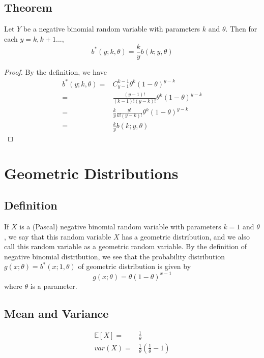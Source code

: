 \documentclass[titlepage]{article}
\begin{document}
        \subsection*{Theorem}
            Let $Y$ be a negative binomial random variable with parameters $k$ and $\theta$. Then for each $y=k,k+1...$,
            $$b^*(y;k,\theta)=\frac{k}{y}b(k;y,\theta)$$
            \begin{proof}
                By the definition, we have 
                \begin{equation*}
                    \begin{split}
                        b^*(y;k,\theta)=&C_{y-1}^{k-1}\theta^k(1-\theta)^{y-k}\\
                            =&\frac{(y-1)!}{(k-1)!(y-k)!}\theta^k(1-\theta)^{y-k}\\
                            =&\frac{k}{y}\frac{y!}{k!(y-k)!}\theta^k(1-\theta)^{y-k}\\
                            =&\frac{k}{y}b(k;y,\theta)
                    \end{split}
                \end{equation*}
            \end{proof}
    \section{Geometric Distributions}
        \subsection*{Definition}
            If $X$ is a (Pascal) negative binomial random variable with parameters $k=1$ and $\theta$, we say that this random variable $X$ has a geometric distribution, and we also call this random variable as a geometric random variable. By the definition of negative binomial distribution, we see that the probability distribution $g(x;\theta)=b^*(x;1,\theta)$ of geometric distribution is given by 
            $$g(x;\theta)=\theta(1-\theta)^{x-1}$$
            where $\theta$ is a parameter.
        \subsection*{Mean and Variance}
            \begin{equation*}
                \begin{split}
                    \mathbb{E}[X]=&\frac{1}{\theta}\\
                    var(X)=&\frac{1}{\theta}(\frac{1}{\theta}-1)
                \end{split}
            \end{equation*}
\end{document}

